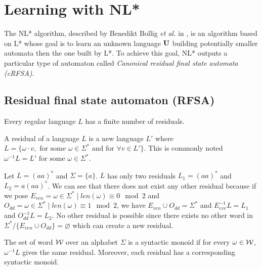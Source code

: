 \section{Learning with NL* }
\label{section:NL}

The NL* algorithm, described by Benedikt Bollig \textit{et al.} in \cite{NLPaper}, is an algorithm based on L* whose goal is to learn an unknown language $\mathbf{U}$ building potentially smaller automata then the one built by L*. To achieve this goal, NL* outputs a particular type of automaton called \textit{Canonical residual final state automata (cRFSA)}.

\subsection{Residual final state automaton (RFSA)}
\label{sec:RFSA}


\begin{theorem}
  Every regular language $L$ has a finite number of residuals.
\end{theorem}

\begin{definition}
  A residual of a language $L$ is a new language $L'$ where $L = \{\omega \cdot v, \text{ for some } \omega \in \Sigma^* \text{ and for } \forall v \in L'\}$. This is commonly noted $\omega^{-1} L = L' \text{ for some } \omega \in \Sigma^*$.
\end{definition}

\begin{example}
  \label{example:residual}
  Let $L = (aa)^*$ and $\Sigma = \{a\}$. $L$ has only two residuals $L_1 = (aa)^*$ and $L_2 = a(aa)^*$. We can see that there does not exist any other residual because if we pose $E_{ven} = {\omega \in \Sigma^* \mid len(\omega) \equiv 0 \mod 2}$ and $O_{dd} = {\omega \in \Sigma^* \mid len(\omega) \equiv 1 \mod 2}$, we have $E_{ven} \cup O_{dd} = \Sigma^*$ and $E_{eve}^{-1}L = L_1$ and $O_{dd}^{-1}L = L_2$. No other residual is possible since there exists no other word in $\Sigma^* / \{E_{ven} \cup O_{dd}\} = \varnothing$ which can create a new residual.
\end{example}

\begin{remark}
  The set of word $\mathcal{W}$ over an alphabet $\Sigma$ is a syntactic monoid if for every $\omega \in \mathcal{W}$, $\omega^{-1}L$ gives the same residual. Moreover, each residual has a corresponding syntactic monoid.
\end{remark}


